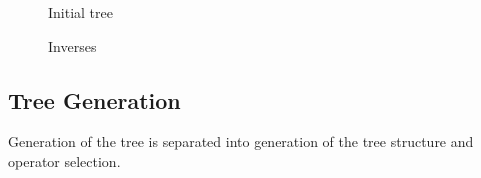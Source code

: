 \documentclass[sigplan,screen]{acmart}
\begin{document}
\begin{figure}[H]
  \centering
  
  \caption{Initial tree}
  \label{fig:gen_tree}
\end{figure}

\begin{figure}[H]
  \centering
  
  
  \caption{Inverses}
  \label{fig:tree_inv}
\end{figure}

\subsection{Tree Generation}
Generation of the tree is separated into generation of the tree structure and operator selection.  
\end{document}
